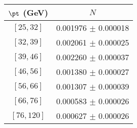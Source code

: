 \begin{tabular}{c||c}
$\pt$ (GeV) & $N$  \\
\hline
$[25, 32]$ & 0.001976 $\pm$ 0.000018\\
$[32, 39]$ & 0.002061 $\pm$ 0.000025\\
$[39, 46]$ & 0.002260 $\pm$ 0.000037\\
$[46, 56]$ & 0.001380 $\pm$ 0.000027\\
$[56, 66]$ & 0.001307 $\pm$ 0.000039\\
$[66, 76]$ & 0.000583 $\pm$ 0.000026\\
$[76, 120]$ & 0.000627 $\pm$ 0.000026\\
\end{tabular}
